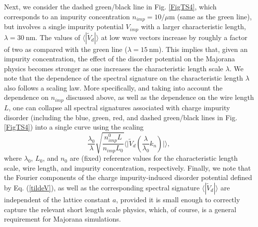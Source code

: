\documentclass[aps,prmaterials,twocolumn,superscriptaddress,longbibliography]{revtex4-2}
\begin{document}
Next, we consider the dashed green/black line in  Fig. \ref{FigTS4}, which corresponds to an impurity concentration $n_{imp}= 10/\mu$m (same as the green line), but involves a single impurity potential $V_{imp}$ with a larger characteristic length, $\lambda = 30~$nm. The values of $\langle|\widetilde{V}_d|\rangle$ at low wave vectors increase by roughly a factor of two as compared with the green line ($\lambda = 15~$nm). This implies that, given an impurity concentration,  the effect of the disorder potential on the Majorana physics becomes stronger as one increases the characteristic length scale $\lambda$. We note that the dependence of the spectral signature on the characteristic length $\lambda$ also follows a scaling law. More specifically, and taking into account the dependence on $n_{imp}$ discussed above, as well as the dependence on the wire length $L$, one can collapse all spectral signatures associated with charge impurity disorder (including the blue, green, red, and dashed green/black lines in Fig. \ref{FigTS4}) into a single curve using the scaling
\begin{equation}
\frac{\lambda_0}{\lambda}\sqrt{\frac{n_{imp}^0 L}{n_{imp} L_0}}\bigg\langle\bigg\vert\widetilde{V}_d\left(\frac{\lambda}{\lambda_0}k_n\right)\bigg\vert\bigg\rangle,    \label{scal}
\end{equation}
where $\lambda_0$, $L_0$, and $n_0$ are (fixed) reference values for the characteristic length scale, wire length, and impurity concentration, respectively. Finally, we note that the Fourier components of the charge impurity-induced disorder potential defined by Eq. (\ref{tildeV}), as well as the corresponding spectral signature  $\langle|\widetilde{V}_d|\rangle$ are independent of the lattice constant $a$, provided it is small enough to correctly capture the relevant short length scale physics, which, of course, is a general requirement for Majorana simulations.  
\end{document}
